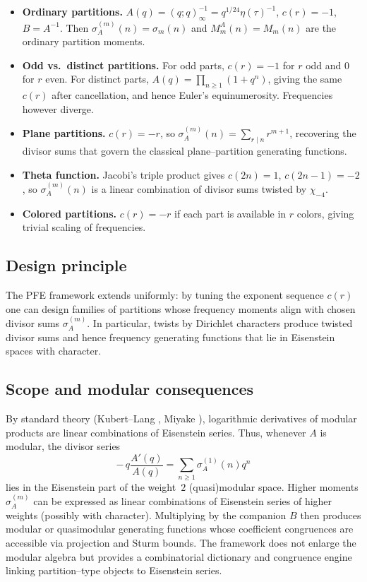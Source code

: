 \documentclass[11pt]{article}
\theoremstyle{definition}
\theoremstyle{remark}
\begin{document}
\begin{itemize}
  \item \textbf{Ordinary partitions.} $A(q)=(q;q)_\infty^{-1}=q^{1/24}\eta(\tau)^{-1}$, $c(r)=-1$, $B=A^{-1}$. Then $\sigma^{(m)}_A(n)=\sigma_m(n)$ and $M^A_m(n)=M_m(n)$ are the ordinary partition moments.
  \item \textbf{Odd vs.\ distinct partitions.} For odd parts, $c(r)=-1$ for $r$ odd and $0$ for $r$ even. For distinct parts, $A(q)=\prod_{n\ge1}(1+q^n)$, giving the same $c(r)$ after cancellation, and hence Euler’s equinumerosity. Frequencies however diverge.
  \item \textbf{Plane partitions.} $c(r)=-r$, so $\sigma^{(m)}_A(n)=\sum_{r\mid n} r^{m+1}$, recovering the divisor sums that govern the classical plane--partition generating functions.
  \item \textbf{Theta function.} Jacobi’s triple product gives $c(2n)=1$, $c(2n-1)=-2$, so $\sigma^{(m)}_A(n)$ is a linear combination of divisor sums twisted by $\chi_{-4}$.
  \item \textbf{Colored partitions.} $c(r)=-r$ if each part is available in $r$ colors, giving trivial scaling of frequencies.
\end{itemize}

\subsection{Design principle}

The PFE framework extends uniformly: by tuning the exponent sequence $c(r)$ one
can design families of partitions whose frequency moments align with chosen
divisor sums $\sigma^{(m)}_A$. In particular, twists by Dirichlet characters
produce twisted divisor sums and hence frequency generating functions that lie
in Eisenstein spaces with character.

\subsection{Scope and modular consequences}

By standard theory (Kubert--Lang \cite{KubertLang1981}, Miyake
\cite{Miyake2006}), logarithmic derivatives of modular products are linear
combinations of Eisenstein series. Thus, whenever $A$ is modular, the divisor series
\[
-\,q\frac{A'(q)}{A(q)}=\sum_{n\ge1}\sigma_A^{(1)}(n)q^n
\]
lies in the Eisenstein part of the weight~$2$ (quasi)modular space. Higher moments $\sigma^{(m)}_A$
can be expressed as linear combinations of Eisenstein series of higher weights
(possibly with character). Multiplying by the companion $B$ then produces modular
or quasimodular generating functions whose coefficient congruences are accessible
via projection and Sturm bounds. The framework does not enlarge the modular
algebra but provides a combinatorial dictionary and congruence engine linking
partition--type objects to Eisenstein series.
\end{document}
